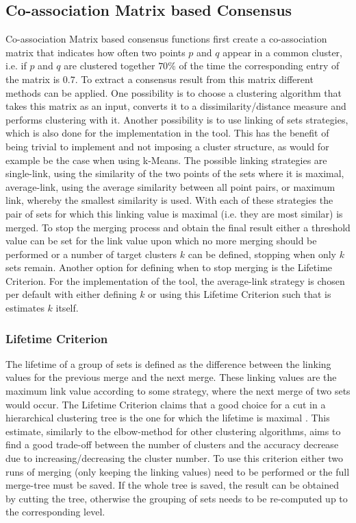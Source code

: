 \documentclass[
	a4paper,
	english,
	twoside,
	openright,               
	11pt                            
	]{report}
\begin{document}
\subsection{Co-association Matrix based Consensus}
Co-association Matrix based consensus functions \cite{Monti2003} first create a co-association matrix that indicates how often two points $p$ and $q$ appear in a common cluster, i.e. if $p$ and $q$ are clustered together $70\%$ of the time the corresponding entry of the matrix is $0.7$. To extract a consensus result from this matrix different methods can be applied. One possibility is to choose a clustering algorithm that takes this matrix as an input, converts it to a dissimilarity/distance measure and performs clustering with it. Another possibility is to use linking of sets strategies, which is also done for the implementation in the tool. This has the benefit of being trivial to implement and not imposing a cluster structure, as would for example be the case when using k-Means. The possible linking strategies are single-link, using the similarity of the two points of the sets where it is maximal, average-link, using the average similarity between all point pairs, or maximum link, whereby the smallest similarity is used. With each of these strategies the pair of sets for which this linking value is maximal (i.e. they are most similar) is merged. To stop the merging process and obtain the final result either a threshold value can be set for the link value upon which no more merging should be performed or a number of target clusters $k$ can be defined, stopping when only $k$ sets remain. Another option for defining when to stop merging is the Lifetime Criterion. For the implementation of the tool, the average-link strategy is chosen per default with either defining $k$ or using this Lifetime Criterion such that is estimates $k$ itself.

\subsubsection{Lifetime Criterion}
The lifetime of a group of sets is defined as the difference between the linking values for the previous merge and the next merge. These linking values are the maximum link value according to some strategy, where the next merge of two sets would occur. The Lifetime Criterion claims that a good choice for a cut in a hierarchical clustering tree is the one for which the lifetime is maximal \cite{YANG201735}. This estimate, similarly to the elbow-method for other clustering algorithms, aims to find a good trade-off between the number of clusters and the accuracy decrease due to increasing/decreasing the cluster number. To use this criterion either two runs of merging (only keeping the linking values) need to be performed or the full merge-tree must be saved. If the whole tree is saved, the result can be obtained by cutting the tree, otherwise the grouping of sets needs to be re-computed up to the corresponding level.
\end{document}
